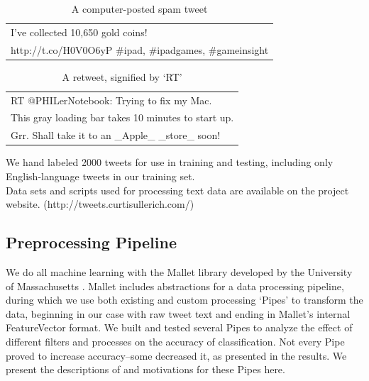 \documentclass[letterpaper]{article}
\begin{document}
\begin{table}[h]
\centering
\begin{tabular}{|l|}
	\hline
	I've collected 10,650 gold coins! \\ http://t.co/H0V0O6yP \#ipad, \#ipadgames, \#gameinsight\\
	\hline
\end{tabular}
\caption{A computer-posted spam tweet}
\end{table}

\begin{table}[h]
\centering
\begin{tabular}{|l|}
	\hline
	RT @PHILerNotebook: Trying to fix my Mac. \\ This gray loading bar takes 10 minutes to start up. \\ Grr. Shall take it to an \_Apple\_ \_store\_ soon! \\
	\hline
\end{tabular}
\caption{A retweet, signified by `RT'}
\end{table}

We hand labeled 2000 tweets for use in training and testing, including only English-language tweets in our training set. \\
Data sets and scripts used for processing text data are available on the project website. (http://tweets.curtisullerich.com/)\\

\subsection{Preprocessing Pipeline}

We do all machine learning with the Mallet library developed by the University of Massachusetts \cite{McCallumMALLET}. Mallet includes abstractions for a data processing pipeline, during which we use both existing and custom processing `Pipes' to transform the data, beginning in our case with raw tweet text and ending in Mallet's internal FeatureVector format. We built and tested several Pipes to analyze the effect of different filters and processes on the accuracy of classification. Not every Pipe proved to increase accuracy--some decreased it, as presented in the results. We present the descriptions of and motivations for these Pipes here.
\end{document}
